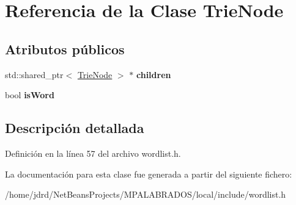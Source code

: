 \hypertarget{classTrieNode}{}\section{Referencia de la Clase Trie\+Node}
\label{classTrieNode}
\subsection*{Atributos públicos}
\begin{DoxyCompactItemize}
\item 
\mbox{\label{classTrieNode_abfaf4116932baeb5904d5f5ea563d67f}} 
std\+::shared\+\_\+ptr$<$ \hyperlink{classTrieNode}{Trie\+Node} $>$ $\ast$ {\bfseries children}
\item 
\mbox{\label{classTrieNode_a675995a5b96c952c10c3c13e22f4baf0}} 
bool {\bfseries is\+Word}
\end{DoxyCompactItemize}


\subsection{Descripción detallada}


Definición en la línea 57 del archivo wordlist.\+h.



La documentación para esta clase fue generada a partir del siguiente fichero\+:\begin{DoxyCompactItemize}
\item 
/home/jdrd/\+Net\+Beans\+Projects/\+M\+P\+A\+L\+A\+B\+R\+A\+D\+O\+S/local/include/wordlist.\+h\end{DoxyCompactItemize}
